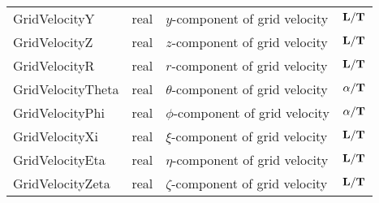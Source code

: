 \begin{longtable}{>{\ttfamily}l >{\ttfamily}l >{\raggedright\arraybackslash}p{\Pwidth} c}
GridVelocityY     & real & $y$-component of grid velocity      &
   ${\bf L}/{\bf T}$ \\
GridVelocityZ     & real & $z$-component of grid velocity      &
   ${\bf L}/{\bf T}$ \\
GridVelocityR     & real & $r$-component of grid velocity      &
   ${\bf L}/{\bf T}$ \\
GridVelocityTheta & real & $\theta$-component of grid velocity &
   ${\alpha}/{\bf T}$ \\
GridVelocityPhi   & real & $\phi$-component of grid velocity   &
   ${\alpha}/{\bf T}$ \\
GridVelocityXi    & real & $\xi$-component of grid velocity    &
   ${\bf L}/{\bf T}$ \\
GridVelocityEta   & real & $\eta$-component of grid velocity   &
   ${\bf L}/{\bf T}$ \\
GridVelocityZeta  & real & $\zeta$-component of grid velocity  &
   ${\bf L}/{\bf T}$ \\
\end{longtable}
